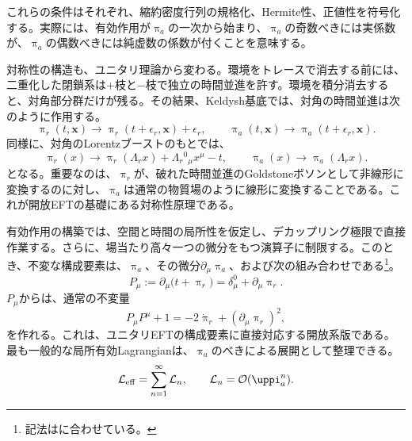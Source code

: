 \documentclass[a4paper,11pt,oneside]{article}
\theoremstyle{definition}
\numberwithin{equation}{section}
\begin{document}
これらの条件はそれぞれ、縮約密度行列の規格化、Hermite性、正値性を符号化する。実際には、有効作用が\(\uppi_a\)の一次から始まり、\(\uppi_a\)の奇数べきには実係数が、\(\uppi_a\)の偶数べきには純虚数の係数が付くことを意味する。



対称性の構造も、ユニタリ理論から変わる。環境をトレースで消去する前には、二重化した閉鎖系は\(+\)枝と\(-\)枝で独立の時間並進を許す。環境を積分消去すると、対角部分群だけが残る。その結果、Keldysh基底では、対角の時間並進は次のように作用する。
\begin{equation}
\uppi_r(t,\mathbf x)\to \uppi_r(t+\epsilon_r,\mathbf x)+\epsilon_r ,
\qquad
\uppi_a(t,\mathbf x)\to \uppi_a(t+\epsilon_r,\mathbf x) .
\end{equation}
同様に、対角のLorentzブーストのもとでは、
\begin{equation}
\uppi_r(x)\to \uppi_r(\Lambda_r x)+\Lambda_r{}^0{}_\mu x^\mu-t ,
\qquad
\uppi_a(x)\to \uppi_a(\Lambda_r x) .
\end{equation}
となる。重要なのは、\(\uppi_r\)が、破れた時間並進のGoldstoneボソンとして非線形に変換するのに対し、\(\uppi_a\)は通常の物質場のように線形に変換することである。これが開放EFTの基礎にある対称性原理である。



有効作用の構築では、空間と時間の局所性を仮定し、デカップリング極限で直接作業する。さらに、場当たり高々一つの微分をもつ演算子に制限する。このとき、不変な構成要素は、\(\uppi_a\)、その微分\(\partial_\mu\uppi_a\)、および次の組み合わせである\footnote{記法は\cite{Salcedo:2024smn}に合わせている。}。
\begin{equation}
P_\mu:=\partial_\mu\bigl(t+\uppi_r\bigr)=\delta_\mu^0+\partial_\mu\uppi_r .
\end{equation}
\(P_\mu\)からは、通常の不変量
\begin{equation}
P_\mu P^\mu+1
=
-2\dot\uppi_r+(\partial_\mu\uppi_r)^2 ,
\end{equation}
を作れる。これは、ユニタリEFTの構成要素に直接対応する開放系版である。最も一般的な局所有効Lagrangianは、\(\uppi_a\)のべきによる展開として整理できる。
\begin{equation}
\mathcal L_{\rm eff}
=
\sum_{n=1}^{\infty}\mathcal L_n,
\qquad
\mathcal L_n=\mathcal O(\uppi_a^n) .
\end{equation}
\end{document}

